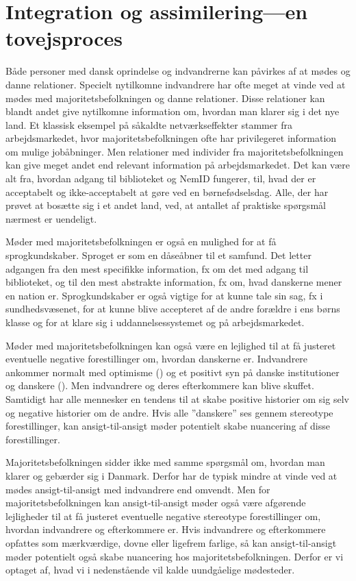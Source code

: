 \documentclass[
]{book}
\begin{document}
\section{Integration og assimilering---en tovejsproces}\label{integration-og-assimileringen-tovejsproces}

Både personer med dansk oprindelse og indvandrerne kan påvirkes af at mødes og danne relationer. Specielt nytilkomne indvandrere har ofte meget at vinde ved at mødes med majoritetsbefolkningen og danne relationer. Disse relationer kan blandt andet give nytilkomne information om, hvordan man klarer sig i det nye land. Et klassisk eksempel på såkaldte netværkseffekter stammer fra arbejdsmarkedet, hvor majoritetsbefolkningen ofte har privilegeret information om mulige jobåbninger. Men relationer med individer fra majoritetsbefolkningen kan give meget andet end relevant information på arbejdsmarkedet. Det kan være alt fra, hvordan adgang til biblioteket og NemID fungerer, til, hvad der er acceptabelt og ikke-acceptabelt at gøre ved en børnefødselsdag. Alle, der har prøvet at bosætte sig i et andet land, ved, at antallet af praktiske spørgsmål nærmest er uendeligt.

Møder med majoritetsbefolkningen er også en mulighed for at få sprogkundskaber. Sproget er som en dåseåbner til et samfund. Det letter adgangen fra den mest specifikke information, fx om det med adgang til biblioteket, og til den mest abstrakte information, fx om, hvad danskerne mener en nation er. Sprogkundskaber er også vigtige for at kunne tale sin sag, fx i sundhedsvæsenet, for at kunne blive accepteret af de andre forældre i ens børns klasse og for at klare sig i uddannelsessystemet og på arbejdsmarkedet.

Møder med majoritetsbefolkningen kan også være en lejlighed til at få justeret eventuelle negative forestillinger om, hvordan danskerne er. Indvandrere ankommer normalt med optimisme () og et positivt syn på danske institutioner og danskere (). Men indvandrere og deres efterkommere kan blive skuffet. Samtidigt har alle mennesker en tendens til at skabe positive historier om sig selv og negative historier om de andre. Hvis alle ''danskere'' ses gennem stereotype forestillinger, kan ansigt-til-ansigt møder potentielt skabe nuancering af disse forestillinger.

Majoritetsbefolkningen sidder ikke med samme spørgsmål om, hvordan man klarer og gebærder sig i Danmark. Derfor har de typisk mindre at vinde ved at mødes ansigt-til-ansigt med indvandrere end omvendt. Men for majoritetsbefolkningen kan ansigt-til-ansigt møder også være afgørende lejligheder til at få justeret eventuelle negative stereotype forestillinger om, hvordan indvandrere og efterkommere er. Hvis indvandrere og efterkommere opfattes som mærkværdige, dovne eller ligefrem farlige, så kan ansigt-til-ansigt møder potentielt også skabe nuancering hos majoritetsbefolkningen. Derfor er vi optaget af, hvad vi i nedenstående vil kalde uundgåelige mødesteder.
\end{document}
